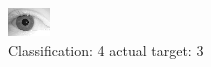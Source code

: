 \begin{figure}[h!]
\begin{center}
\includegraphics[width=0.60\columnwidth]{figures/ID2091_class_4_target_3.png}
\end{center}
\caption{ Classification: 4 actual target: 3}
\label{fig:ID2091_class_4_target_3}
\end{figure}
